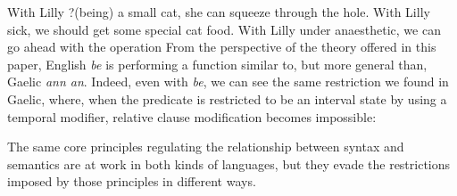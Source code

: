\documentclass[output=paper]{langsci/langscibook}
\begin{document}
\ea
    \ea With Lilly ?(being) a small cat, she can squeeze through the hole.
    \ex With Lilly sick, we should get some special cat food.
    \ex With Lilly under anaesthetic, we can go ahead with the operation
    \z
\z
From the perspective of the theory offered in this paper, English \emph{be} is
performing a function similar to, but more general than, Gaelic \emph{ann an}.
Indeed, even with \emph{be}, we can see the same restriction we found in
Gaelic, where, when the predicate is restricted to be an interval state by
using a temporal modifier, relative clause modification becomes impossible:

\z
The same core principles regulating the relationship between syntax and
se\-man\-tics are at work in both kinds of languages, but they evade the
restrictions imposed by those principles in different ways.
\end{document}
